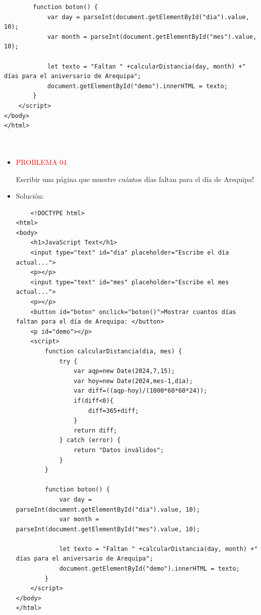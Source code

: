 \documentclass{article}
\begin{document}
\begin{itemize}
\begin{itemize}
\begin{verbatim}
        function boton() {
            var day = parseInt(document.getElementById("dia").value, 10);
            var month = parseInt(document.getElementById("mes").value, 10);

            let texto = "Faltan " +calcularDistancia(day, month) +" días para el aniversario de Arequipa";
            document.getElementById("demo").innerHTML = texto;
        }
    </script>
</body>
</html>

    
    \end{verbatim}

\end{itemize}
\begin{itemize}
    \item \textcolor{red}{PROBLEMA 04}
    
    Escribir una página que muestre cuántos días faltan para el día de Arequipa!
    
    \item Solución:
    \begin{verbatim}
    <!DOCTYPE html>
<html>
<body>
    <h1>JavaScript Text</h1>
    <input type="text" id="dia" placeholder="Escribe el día actual...">
    <p></p>
    <input type="text" id="mes" placeholder="Escribe el mes actual...">
    <p></p>
    <button id="boton" onclick="boton()">Mostrar cuantos días faltan para el día de Arequipa: </button>
    <p id="demo"></p>
    <script>
        function calcularDistancia(dia, mes) {
            try {
            	var aqp=new Date(2024,7,15);
                var hoy=new Date(2024,mes-1,dia);
                var diff=((aqp-hoy)/(1000*60*60*24));
                if(diff<0){
                	diff=365+diff;
                }
                return diff;
            } catch (error) {
                return "Datos inválidos";
            }
        }

        function boton() {
            var day = parseInt(document.getElementById("dia").value, 10);
            var month = parseInt(document.getElementById("mes").value, 10);

            let texto = "Faltan " +calcularDistancia(day, month) +" días para el aniversario de Arequipa";
            document.getElementById("demo").innerHTML = texto;
        }
    </script>
</body>
</html>

    
    \end{verbatim}

\end{itemize}


\end{itemize}
\end{document}
